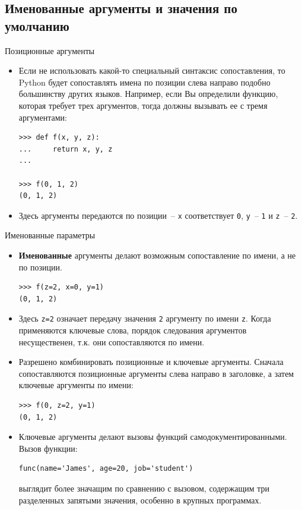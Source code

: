 \documentclass[aspectratio=169]{beamer}%
\begin{document}
\subsection{Именованные аргументы и значения по умолчанию}
\begin{frame}[fragile]{Позиционные аргументы}
\scriptsize
\begin{itemize}
\item Если не использовать какой-то специальный синтаксис сопоставления, то Python будет сопоставлять имена по позиции слева направо подобно большинству других языков. Например, если Вы определили функцию, которая требует трех аргументов, тогда должны вызывать ее с тремя аргументами:

\begin{verbatim}
>>> def f(x, y, z):
...     return x, y, z
...

>>> f(0, 1, 2)
(0, 1, 2)
\end{verbatim}
\item Здесь аргументы передаются по позиции~-- \texttt{x} соответствует \texttt{0}, \texttt{y}~-- \texttt{1} и \texttt{z}~-- \texttt{2}.
\end{itemize}
\vfill
\end{frame}


\begin{frame}[fragile]{Именованные параметры}
\scriptsize
\begin{itemize}
\item \textcolor{extraorange}{\textbf{Именованные}} аргументы делают возможным сопоставление по имени, а не по позиции.

\begin{verbatim}
>>> f(z=2, x=0, y=1)
(0, 1, 2)
\end{verbatim}

\item Здесь \texttt{z=2} означает передачу значения \texttt{2} аргументу по имени \texttt{z}. Когда применяются ключевые слова, порядок следования аргументов несущественен, т.к. они сопоставляются по имени. 
\item Разрешено комбинировать позиционные и ключевые аргументы. Сначала сопоставляются позиционные аргументы слева направо в заголовке, а затем ключевые аргументы по имени:

\begin{verbatim}
>>> f(0, z=2, y=1)
(0, 1, 2)
\end{verbatim}

\item Ключевые аргументы делают вызовы функций самодокументированными. Вызов функции:

\begin{verbatim}
func(name='James', age=20, job='student')
\end{verbatim}

\noindent выглядит более значащим по сравнению с вызовом, содержащим три разделенных запятыми значения, особенно в крупных программах.
\end{itemize}
\vfill
\end{frame}
\end{document}
